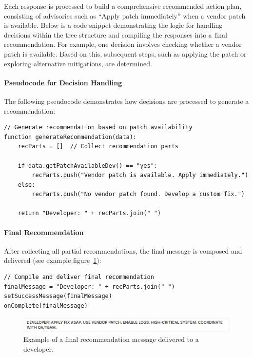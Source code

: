 Each response is processed to build a comprehensive recommended action plan, consisting of advisories such as \enquote{Apply patch immediately} when a vendor patch is available. Below is a code snippet demonstrating the logic for handling decisions within the tree structure and compiling the responses into a final recommendation. For example, one decision involves checking whether a vendor patch is available. Based on this, subsequent steps, such as applying the patch or exploring alternative mitigations, are determined.

\paragraph{Pseudocode for Decision Handling}
The following pseudocode demonstrates how decisions are processed to generate a recommendation:

\begin{verbatim}
// Generate recommendation based on patch availability
function generateRecommendation(data):
    recParts = []  // Collect recommendation parts

    if data.getPatchAvailableDev() == "yes":
        recParts.push("Vendor patch is available. Apply immediately.")
    else:
        recParts.push("No vendor patch found. Develop a custom fix.")

    return "Developer: " + recParts.join(" ")
\end{verbatim}

\paragraph{Final Recommendation}
After collecting all partial recommendations, the final message is composed and delivered (see example figure~\ref{fig:ssvc-recommendation}):

\begin{verbatim}
// Compile and deliver final recommendation
finalMessage = "Developer: " + recParts.join(" ")
setSuccessMessage(finalMessage)
onComplete(finalMessage)
\end{verbatim}

\begin{figure}[H]
    \centering
    \includegraphics[width=0.8\linewidth]{resources/SSVC_Recommandation.png}
    \caption{Example of a final recommendation message delivered to a developer.}
    \label{fig:ssvc-recommendation}
\end{figure}

